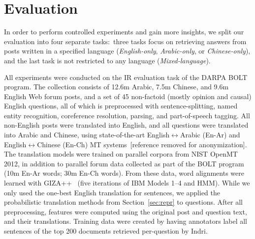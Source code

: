 \documentclass{sig-alternate-05-2015}
\newcommand{\ignore}[1]{}
\begin{document}
\section{Evaluation}\label{sec:eval}
In order to perform controlled experiments and gain more 
insights, we split our evaluation into four separate tasks:\ three tasks focus on retrieving answers from posts written in a specified language 
(\emph{English-only}, \emph{Arabic-only}, or \emph{Chinese-only}), and the last task is not restricted to any language 
(\emph{Mixed-language}). 


All experiments were conducted on the IR evaluation task of the DARPA BOLT 
program. The collection consists of 12.6m Arabic, 7.5m Chinese, and 9.6m English Web forum posts, and a 
set of 45 non-factoid (mostly opinion and causal) English questions, all of which is preprocessed with 
sentence-splitting, named entity recognition, coreference resolution, parsing, and part-of-speech tagging. 
All non-English posts were translated into English, and all questions were translated into Arabic and Chinese,
using state-of-the-art English$\leftrightarrow$Arabic (En-Ar) and English$\leftrightarrow$Chinese 
(En-Ch) MT systems~[reference removed for anonymization]. 
The translation models were trained on parallel corpora from NIST OpenMT 2012, in addition to parallel forum 
data collected as part of the BOLT program (10m En-Ar words; 30m En-Ch words). 
From these data, word alignments were learned with GIZA++~\cite{Och:2003} (five iterations of IBM Models 1--4 
and HMM). While we only used the 
one-best English translation for sentences, we applied the probabilistic translation methods from Section~\ref{sec:repr} 
to questions. 
After all preprocessing, features were computed using the original post and question text, and their translations.
Training data were created by having annotators label all sentences of the top 200 documents retrieved per-question by Indri.
\ignore{
Due to the nature of retrieval tasks, labels of the training data are usually unbalanced, with more negatively labeled sentences. 
In order to correct this, we split the data into balanced subsets (each sharing the same set of positively labeled data) 
and train multiple classifiers, then take a majority vote when predicting.
}
\end{document}
